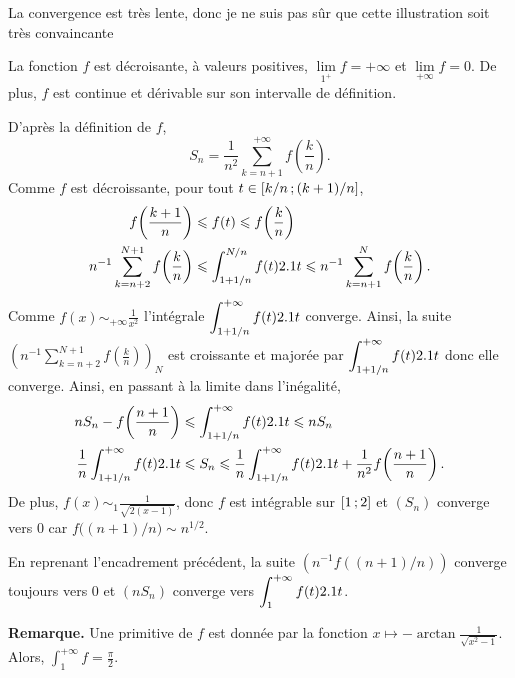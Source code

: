 \begin{marginfigure}
    \centering
    
    \caption{La convergence est très lente, donc je ne suis pas sûr que cette illustration soit très convaincante}
\end{marginfigure}



\begin{elemsolution}
\begin{reponses}
\item La fonction $f$ est décroisante, à valeurs positives, $\lim\limits_{1^+} f = +\infty$ et $\lim\limits_{+\infty} f = 0$. De plus, $f$ est continue et dérivable sur son intervalle de définition.
\item D'après la définition de $f$,
\[
S_n = \frac{1}{n^2} \sum\limits_{k=n+1}^{+\infty} f\mathopen{}\left(\frac{k}{n}\right).
\]
Comme $f$ est décroissante, pour tout $t \in \left[k/n\,;(k+1)/n\right]$,
\begin{align*}
f\mathopen{}\left(\frac{k+1}{n}\right) &\leqslant f(t) \leqslant f\mathopen{}\left(\frac{k}{n}\right) \\
n^{-1} \sum\limits_{k=n+2}^{N+1} f\mathopen{}\left(\frac{k}{n}\right) &\leqslant \displaystyle\int_{1+1/n}^{N/n} f(t) 2.1 t \leqslant n^{-1} \sum\limits_{k=n+1}^{N} f\mathopen{}\left(\frac{k}{n}\right).
\end{align*}
Comme $f(x) \sim_{+\infty} \frac{1}{x^2}$ l'intégrale $\displaystyle\int_{1+1/n}^{+\infty} f(t) 2.1 t$ converge. Ainsi, la suite $\left(n^{-1}\sum\limits_{k=n+2}^{N+1} f\mathopen{}\left(\frac{k}{n}\right)\right)_N$ est croissante et majorée par $\displaystyle\int_{1+1/n}^{+\infty} f(t) 2.1 t$ donc elle converge. Ainsi, en passant à la limite dans l'inégalité,
\begin{align*}
n S_n - f\mathopen{}\left(\frac{n+1}{n}\right) &\leqslant \displaystyle\int_{1+1/n}^{+\infty} f(t) 2.1 t \leqslant n S_n \\
\frac{1}{n} \displaystyle\int_{1+1/n}^{+\infty} f(t) 2.1 t &\leqslant S_n \leqslant \frac{1}{n} \displaystyle\int_{1+1/n}^{+\infty} f(t) 2.1 t + \frac{1}{n^2} f\mathopen{}\left(\frac{n+1}{n}\right).
\end{align*}
De plus, $f(x) \sim_1 \frac{1}{\sqrt{2 (x - 1)}}$, donc $f$ est intégrable sur $\left[1\,;2\right]$ et $(S_n)$ converge vers $0$ car $f\mathopen{}\big((n+1)/n\big) \sim n^{1/2}$.

\item En reprenant l'encadrement précédent, la suite $\left(n^{-1} f((n+1)/n)\right)$ converge toujours vers $0$ et $(n S_n)$ converge vers $\displaystyle\int_1^{+\infty} f(t) 2.1 t$.

\textbf{Remarque.} Une primitive de $f$ est donnée par la fonction $x \mapsto - \arctan\frac{1}{\sqrt{x^2 - 1}}$. Alors, $\displaystyle\int_1^{+\infty} f = \frac{\pi}{2}$.
\end{reponses}
\end{elemsolution}